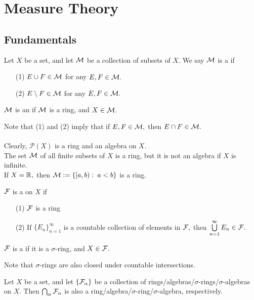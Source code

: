 \chapter{Measure Theory}

\section{Fundamentals}

\begin{defn}
Let $X$ be a set, and let $\mathcal{M}$ be a collection of subsets of $X.$ We say $\mathcal{M}$ is a  if 
\begin{enumerate}
\item[(1)] $E\cup F\in\mathcal{M}$ for any $E,F\in\mathcal{M}.$
\item[(2)] $E\setminus F\in\mathcal{M}$ for any $E,F\in\mathcal{M}.$
\end{enumerate}
$\mathcal{M}$ is an  if $\mathcal{M}$ is a ring, and $X\in\mathcal{M}.$
\end{defn}

\noindent Note that (1) and (2) imply that if $E,F\in\mathcal{M},$ then $E\cap F\in\mathcal{M}.$ \\ \\
\Ex Clearly, $\mathcal{P}(X)$ is a ring and an algebra on $X.$ \\
\Ex The set $\mathcal{M}$ of all finite subsets of $X$ is a ring, but it is not an algebra if $X$ is infinite. \\
\Ex If $X=\mathbb{R}^{},$ then $\mathcal{M}:=\{[a,b):\;a<b\}$ is a ring.

\begin{defn}
$\mathcal{F}$ is a  on $X$ if
\begin{enumerate}
\item[(1)] $\mathcal{F}$ is a ring
\item[(2)] If $\{E_n\}_{n=1}^{\infty}$ is a countable collection of elements in $\mathcal{F},$ then $\bigcup\limits_{n=1}^{\infty} E_n\in\mathcal{F}.$
\end{enumerate}
$\mathcal{F}$ is a  if it is a $\sigma$-ring, and $X\in\mathcal{F}.$
\end{defn}

\noindent Note that $\sigma$-rings are also closed under countable intersections.

\begin{prop} Let $X$ be a set, and let $\{\mathcal{F}_{\alpha}\}$ be a collection of rings/algebras/$\sigma$-rings/$\sigma$-algebras on $X.$ Then $\bigcap_{\alpha}\mathcal{F}_{\alpha}$ is also a ring/algebra/$\sigma$-ring/$\sigma$-algebra, respectively. \\ \\
\end{prop}

